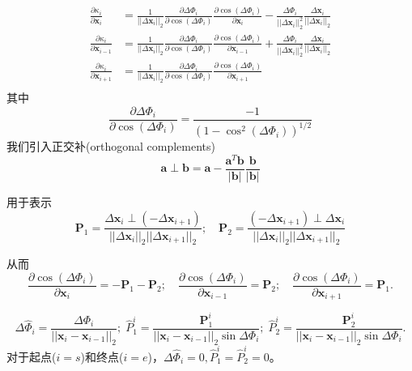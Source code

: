 \begin{equation} 
  \begin{aligned}
    \frac{\partial \kappa_i}{\partial \bm{x}_i} 
    &= \frac{1}{|| \Delta \bm{x}_i ||_2} \frac{\partial \Delta \Phi_i}{ \partial \cos(\Delta \Phi_i)}
    \frac{\partial \cos(\Delta \Phi_i)}{\partial \bm{x}_i} - 
    \frac{\Delta\Phi_i}{|| \Delta \bm{x}_i ||_2^2} \frac{\Delta \bm{x}_i}{|| \Delta \bm{x}_i ||_2}
    \\
    \frac{\partial \kappa_i}{\partial \bm{x}_{i-1}} 
    &=\frac{1}{|| \Delta \bm{x}_i ||_2} \frac{\partial \Delta \Phi_i}{ \partial \cos(\Delta \Phi_i)}
    \frac{\partial \cos(\Delta \Phi_i)}{\partial \bm{x}_{i-1}} +  
    \frac{\Delta\Phi_i}{|| \Delta \bm{x}_i ||_2^2} \frac{\Delta \bm{x}_i}{|| \Delta \bm{x}_i ||_2} 
    \\
    \frac{\partial \kappa_i}{\partial \bm{x}_{i+1}} 
    &=\frac{1}{|| \Delta \bm{x}_i ||_2} \frac{\partial \Delta \Phi_i}{ \partial \cos(\Delta \Phi_i)}
        \frac{\partial \cos(\Delta \Phi_i)}{\partial \bm{x}_{i+1}} \\
  \end{aligned}
\end{equation}
其中
\begin{equation} 
  \frac{\partial \Delta \Phi_i}{ \partial \cos(\Delta \Phi_i)} = 
  \frac{-1}{\left( 1-\cos^2(\Delta \Phi_i) \right)^{1/2}}
\end{equation}
我们引入正交补(orthogonal complements)
\begin{equation} 
   \bm{a} \perp \bm{b}= \bm{a} - \frac{ \bm{a}^T \bm{b}}{|\bm{b}|} \frac{\bm{b}}{|\bm{b}|}
\end{equation}

用于表示
\begin{equation} 
   \bm{P}_1 = \frac{ \Delta \bm{x}_i \perp (-\Delta \bm{x}_{i+1})}
   {||\Delta \bm{x}_i||_2 ||\Delta \bm{x}_{i+1}||_2} ; \quad 
   \bm{P}_2 = \frac{ (-\Delta \bm{x}_{i+1}) \perp \Delta \bm{x}_i }
   {||\Delta \bm{x}_i||_2 ||\Delta \bm{x}_{i+1}||_2} 
\end{equation}

从而
\begin{equation} 
   \frac{\partial \cos(\Delta \Phi_i)}{\partial \bm{x}_i} = -\bm{P}_1 - \bm{P}_2; \quad
   \frac{\partial \cos(\Delta \Phi_i)}{\partial \bm{x}_{i-1}} = \bm{P}_2; \quad
   \frac{\partial \cos(\Delta \Phi_i)}{\partial \bm{x}_{i+1}} = \bm{P}_1. 
\end{equation}


\begin{equation} 
  \Delta \hat{\Phi}_i= \frac{\Delta \Phi_i}{|| \bm{x}_i - \bm{x}_{i-1}||_2}; \;
  \hat{P}_1^i= \frac{\bm{P}_1^i}{|| \bm{x}_i - \bm{x}_{i-1}||_2 \sin \Delta \Phi_i}; \; 
  \hat{P}_2^i= \frac{\bm{P}_2^i}{|| \bm{x}_i - \bm{x}_{i-1}||_2 \sin \Delta \Phi_i}.
\end{equation}
对于起点($i=s$)和终点($i=e$)，$\Delta \hat{\Phi}_i=0, \hat{P}_1^i=\hat{P}_2^i=0$。

